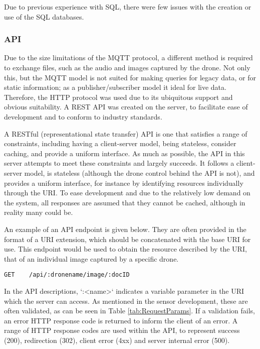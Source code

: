 \documentclass{article}
\begin{document}
Due to previous experience with SQL, there were few issues with the creation or use of the SQL databases. 

\subsubsection{API} \label{API}
Due to the size limitations of the MQTT protocol, a different method is required to exchange files, such as the audio and images captured by the drone. Not only this, but the MQTT model is not suited for making queries for legacy data, or for static information; as a publisher/subscriber model it ideal for live data. Therefore, the HTTP protocol was used due to its ubiquitous support and obvious suitability. A REST API was created on the server, to facilitate ease of development and to conform to industry standards. 

A RESTful (representational state transfer) API is one that satisfies a range of constraints, including having a client-server model, being stateless, consider caching, and provide a uniform interface. As much as possible, the API in this server attempts to meet these constraints and largely succeeds. It follows a client-server model, is stateless (although the drone control behind the API is not), and provides a uniform interface, for instance by identifying resources individually through the URI. To ease development and due to the relatively low demand on the system, all responses are assumed that they cannot be cached, although in reality many could be. 

An example of an API endpoint is given below. They are often provided in the format of a URI extension, which should be concatenated with the base URI for use. This endpoint would be used to obtain the resource described by the URI, that of an individual image captured by a specific drone.
\begin{lstlisting}
GET    /api/:dronename/image/:docID
\end{lstlisting}
In the API descriptions, `:\textless name\textgreater` indicates a variable parameter in the URI which the server can access\cite{expressDocs}. As mentioned in the sensor development, these are often validated, as can be seen in Table \ref{tab:RequestParams}. If a validation fails, an error HTTP response code is returned to inform the client of an error. A range of HTTP response codes are used within the API, to represent success (200), redirection (302), client error (4xx) and server internal error (500).
\end{document}
